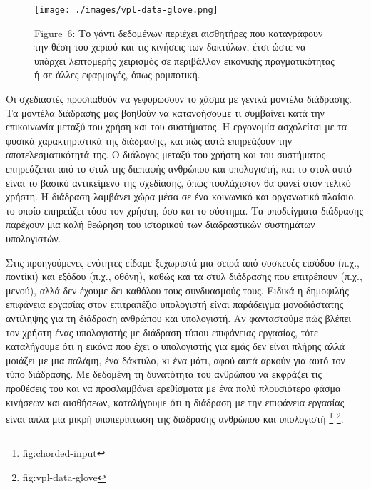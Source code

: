 \documentclass[
]{article}
\begin{document}
\leavevmode{}%
\begin{figure}
\hypertarget{fig:vpl-data-glove}{%
\centering
\texttt{[image: ./images/vpl-data-glove.png]}
\caption{Figure~6: Το γάντι δεδομένων περιέχει αισθητήρες που
καταγράφουν την θέση του χεριού και τις κινήσεις των δακτύλων, έτσι ώστε
να υπάρχει λεπτομερής χειρισμός σε περιβάλλον εικονικής πραγματικότητας
ή σε άλλες εφαρμογές, όπως ρομποτική.}\label{fig:vpl-data-glove}
}
\end{figure}

Οι σχεδιαστές προσπαθούν να γεφυρώσουν το χάσμα με γενικά μοντέλα
διάδρασης. Τα μοντέλα διάδρασης μας βοηθούν να κατανοήσουμε τι συμβαίνει
κατά την επικοινωνία μεταξύ του χρήση και του συστήματος. Η εργονομία
ασχολείται με τα φυσικά χαρακτηριστικά της διάδρασης, και πώς αυτά
επηρεάζουν την αποτελεσματικότητά της. Ο διάλογος μεταξύ του χρήστη και
του συστήματος επηρεάζεται από το στυλ της διεπαφής ανθρώπου και
υπολογιστή, και το στυλ αυτό είναι το βασικό αντικείμενο της σχεδίασης,
όπως τουλάχιστον θα φανεί στον τελικό χρήστη. Η διάδραση λαμβάνει χώρα
μέσα σε ένα κοινωνικό και οργανωτικό πλαίσιο, το οποίο επηρεάζει τόσο
τον χρήστη, όσο και το σύστημα. Τα υποδείγματα διάδρασης παρέχουν μια
καλή θεώρηση του ιστορικού των διαδραστικών συστημάτων υπολογιστών.

Στις προηγούμενες ενότητες είδαμε ξεχωριστά μια σειρά από συσκευές
εισόδου (π.χ., ποντίκι) και εξόδου (π.χ., οθόνη), καθώς και τα στυλ
διάδρασης που επιτρέπουν (π.χ., μενού), αλλά δεν έχουμε δει καθόλου τους
συνδυασμούς τους. Ειδικά η δημοφιλής επιφάνεια εργασίας στον επιτραπέζιο
υπολογιστή είναι παράδειγμα μονοδιάστατης αντίληψης για τη διάδραση
ανθρώπου και υπολογιστή. Αν φανταστούμε πώς βλέπει τον χρήστη ένας
υπολογιστής με διάδραση τύπου επιφάνειας εργασίας, τότε καταλήγουμε ότι
η εικόνα που έχει ο υπολογιστής για εμάς δεν είναι πλήρης αλλά μοιάζει
με μια παλάμη, ένα δάκτυλο, κι ένα μάτι, αφού αυτά αρκούν για αυτό τον
τύπο διάδρασης. Με δεδομένη τη δυνατότητα του ανθρώπου να εκφράζει τις
προθέσεις του και να προσλαμβάνει ερεθίσματα με ένα πολύ πλουσιότερο
φάσμα κινήσεων και αισθήσεων, καταλήγουμε ότι η διάδραση με την
επιφάνεια εργασίας είναι απλά μια μικρή υποπερίπτωση της διάδρασης
ανθρώπου και υπολογιστή \footnote{fig:chorded-input} \footnote{fig:vpl-data-glove}.
\end{document}
